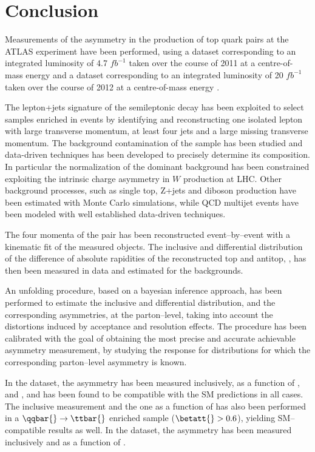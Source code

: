 \chapter{Conclusion}
\label{sec:conclusion}

Measurements of the asymmetry in the production of top quark pairs at the ATLAS
experiment have been performed, using a dataset corresponding to an
integrated luminosity of 4.7 $fb^{−1}$ taken over the course of 2011
at a centre-of-mass energy \seventev{} and a dataset corresponding
to an integrated luminosity of 20 $fb^{−1}$ taken over the course of 2012
at a centre-of-mass energy \eighttev{}.

The lepton+jets signature of the semileptonic \ttbar{} decay has been
exploited to select samples enriched in \ttbar{} events by
identifying and reconstructing one isolated lepton with large
transverse momentum, at least four jets and a large missing transverse
momentum.
The background contamination of the sample has been studied and data-driven
techniques has been developed to precisely determine its
composition. In particular the normalization of the dominant \wjets{} background
has been constrained exploiting the intrinsic charge asymmetry in $W$
production at LHC.
Other background processes, such as single top, Z+jets and diboson
production have been estimated with Monte Carlo simulations, while QCD
multijet events have been modeled with well established data-driven
techniques.

The four momenta of the \ttbar{} pair has been reconstructed event--by--event with a
kinematic fit of the measured objects. The inclusive and differential
distribution of the difference of absolute rapidities of the
reconstructed top and antitop, \dy{}, has then been measured in data
and estimated for the backgrounds.

An unfolding procedure, based on a bayesian inference approach, has
been performed to estimate the inclusive and differential \dy{}
distribution, and the corresponding asymmetries, at the parton--level,
taking into account the distortions induced by acceptance and
resolution effects.
The procedure has been calibrated with the goal of obtaining the most
precise and accurate achievable asymmetry measurement, by studying the
response for distributions for which the corresponding parton--level
asymmetry is known.

In the \seventev{} dataset, the asymmetry \ac{} has been measured
inclusively, as a function of \mtt{}, \pttt{} and \ytt{}, and has been found
to be compatible with the SM predictions in all cases. The inclusive
measurement and the one as a function of \mtt{} has also been performed in
a $\qqbar{}\to\ttbar{}$ enriched sample ($\betatt{}>0.6$), yielding
SM--compatible results as well.
In the \eighttev{} dataset, the asymmetry \ac{} has been measured
inclusively and as a function of \mtt{}.  